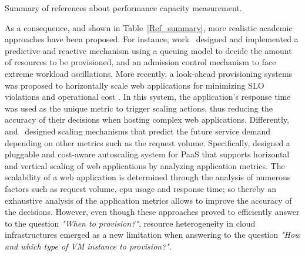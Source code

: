 \begin{table*}
{\caption{Summary of references about performance capacity measurement.}
\label{Ref_summary}
}
\end{table*}

As a consequence, and shown in Table~\ref{Ref_summary}, more realistic academic approaches have been proposed. For instance, work~\cite{urgaonkar_agile_2008} designed and implemented a predictive and reactive mechanism using a queuing model to decide the amount of resources to be provisioned, and an admission control mechanism to face extreme workload oscillations. More recently, a look-ahead provisioning systems was proposed to horizontally scale web applications for minimizing SLO violations and operational cost \cite{roy_efficient_2011}. In this system, the application's response time was used as the unique metric to trigger scaling actions, thus reducing the accuracy of their decisions when hosting complex web applications. Differently,~\cite{ali-eldin_2012} and~\cite{bunch_2012} designed scaling mechanisms that predict the future service demand depending on other metrics such as the request volume. Specifically, \cite{bunch_2012} designed a pluggable and cost-aware autoscaling system for PaaS that supports horizontal and vertical scaling of web applications by analyzing application metrics. The scalability of a web application is determined through the analysis of numerous factors such as request volume, cpu usage and response time; so thereby an exhaustive analysis of the application metrics allows to improve the accuracy of the decisions. However, even though these approaches proved to efficiently answer to the question \emph{"When to provision?"}, resource heterogeneity in cloud infrastructures emerged as a new limitation when answering to the question \emph{"How and which type of VM instance to provision?"}.





